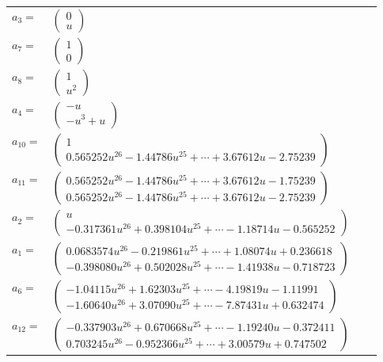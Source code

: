 \documentclass[1p]{elsarticle_modified}
\theoremstyle{definition}
\begin{document}
\begin{tabular}{m{7pt} m{180pt} m{7pt} m{180pt} }
\flushright $a_{3}=$&$\begin{pmatrix}0\\u\end{pmatrix}$ \\
\flushright $a_{7}=$&$\begin{pmatrix}1\\0\end{pmatrix}$ \\
\flushright $a_{8}=$&$\begin{pmatrix}1\\u^2\end{pmatrix}$ \\
\flushright $a_{4}=$&$\begin{pmatrix}- u\\- u^3+u\end{pmatrix}$ \\
\flushright $a_{10}=$&$\begin{pmatrix}1\\0.565252 u^{26}-1.44786 u^{25}+\cdots+3.67612 u-2.75239\end{pmatrix}$ \\
\flushright $a_{11}=$&$\begin{pmatrix}0.565252 u^{26}-1.44786 u^{25}+\cdots+3.67612 u-1.75239\\0.565252 u^{26}-1.44786 u^{25}+\cdots+3.67612 u-2.75239\end{pmatrix}$ \\
\flushright $a_{2}=$&$\begin{pmatrix}u\\-0.317361 u^{26}+0.398104 u^{25}+\cdots-1.18714 u-0.565252\end{pmatrix}$ \\
\flushright $a_{1}=$&$\begin{pmatrix}0.0683574 u^{26}-0.219861 u^{25}+\cdots+1.08074 u+0.236618\\-0.398080 u^{26}+0.502028 u^{25}+\cdots-1.41938 u-0.718723\end{pmatrix}$ \\
\flushright $a_{6}=$&$\begin{pmatrix}-1.04115 u^{26}+1.62303 u^{25}+\cdots-4.19819 u-1.11991\\-1.60640 u^{26}+3.07090 u^{25}+\cdots-7.87431 u+0.632474\end{pmatrix}$ \\
\flushright $a_{12}=$&$\begin{pmatrix}-0.337903 u^{26}+0.670668 u^{25}+\cdots-1.19240 u-0.372411\\0.703245 u^{26}-0.952366 u^{25}+\cdots+3.00579 u+0.747502\end{pmatrix}$ \\

\end{tabular}
\end{document}
